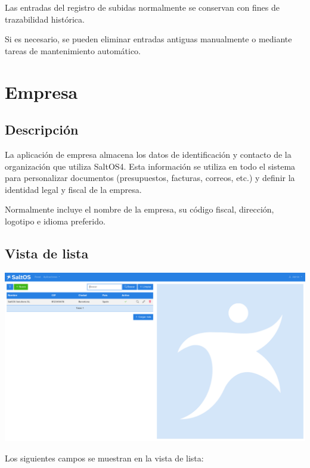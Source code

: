 \documentclass[a4paper]{article}
\begin{document}
Las entradas del registro de subidas normalmente se conservan con fines de trazabilidad histórica.

Si es necesario, se pueden eliminar entradas antiguas manualmente o mediante tareas de mantenimiento automático.


\hypertarget{toc41}{}
\section{Empresa}

\hypertarget{toc42}{}
\subsection{Descripción}

La aplicación de empresa almacena los datos de identificación y contacto de la organización que utiliza SaltOS4.
Esta información se utiliza en todo el sistema para personalizar documentos (presupuestos, facturas, correos, etc.) y definir la identidad legal y fiscal de la empresa.

Normalmente incluye el nombre de la empresa, su código fiscal, dirección, logotipo e idioma preferido.

\hypertarget{toc43}{}
\subsection{Vista de lista}

\begin{center}\includegraphics[width=1\textwidth]{../ujest/snaps/test-screenshots-js-screenshots-company-company-list-es-es-1-snap.png}\end{center}

Los siguientes campos se muestran en la vista de lista:
\end{document}
